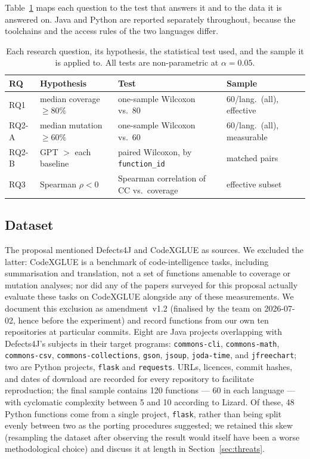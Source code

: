 Table~\ref{tab:rqmap} maps each question to the test that answers it and to the data it is
answered on. Java and Python are reported separately throughout, because the toolchains and
the access rules of the two languages differ.

\begin{table}[t]
\centering
\caption{Each research question, its hypothesis, the statistical test used, and the sample it
is applied to. All tests are non-parametric at $\alpha = 0.05$.}
\label{tab:rqmap}
\begin{tabular}{llll}
\hline
RQ & Hypothesis & Test & Sample \\
\hline
RQ1   & median coverage $\ge 80\%$ & one-sample Wilcoxon vs.\ 80 & 60/lang.\ (all), effective \\
RQ2-A & median mutation $\ge 60\%$ & one-sample Wilcoxon vs.\ 60 & 60/lang.\ (all), measurable \\
RQ2-B & GPT $>$ each baseline      & paired Wilcoxon, by \texttt{function\_id} & matched pairs \\
RQ3   & Spearman $\rho < 0$        & Spearman correlation of CC vs.\ coverage & effective subset \\
\hline
\end{tabular}
\end{table}

\subsection{Dataset}
The proposal mentioned Defects4J and CodeXGLUE as sources. We excluded the latter:
CodeXGLUE is a benchmark of code-intelligence tasks, including summarisation and
translation, not a set of functions amenable to coverage or mutation analyses; nor did
any of the papers surveyed for this proposal actually evaluate these tasks on CodeXGLUE
alongside any of these measurements. We document this exclusion as amendment~v1.2
(finalised by the team on 2026-07-02, hence before the experiment) and record functions
from our own ten repositories at particular commits. Eight are Java projects overlapping
with Defects4J's subjects in their target programs: \texttt{commons-cli},
\texttt{commons-math}, \texttt{commons-csv}, \texttt{commons-collections}, \texttt{gson},
\texttt{jsoup}, \texttt{joda-time}, and \texttt{jfreechart}; two are Python projects,
\texttt{flask} and \texttt{requests}. URLs, licences, commit hashes, and dates of
download are recorded for every repository to facilitate reproduction; the final sample
contains 120 functions --- 60 in each language --- with cyclomatic complexity between 5
and 10 according to Lizard. Of these, 48 Python functions come from a single project,
\texttt{flask}, rather than being split evenly between two as the porting procedures
suggested; we retained this skew (resampling the dataset after observing the result
would itself have been a worse methodological choice) and discuss it at length in
Section~\ref{sec:threats}.


